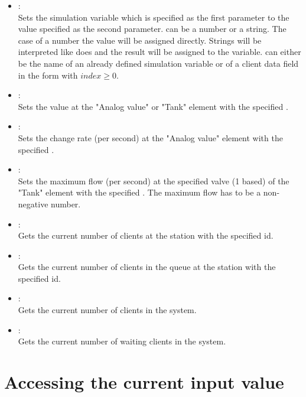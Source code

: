 \begin{itemize}

\item
{}:\\
Sets the simulation variable which is specified as the first parameter to the value specified as the second parameter.  
 can be a number or a string. The case of a number the value will be assigned directly.
Strings will be interpreted like  does and the result will be assigned to the variable. 
can either be the name of an already defined simulation variable or of a client data field in the form
 with $index\ge0$.

\item
{}:\\
Sets the value at the "Analog value" or "Tank" element with the specified .
  
\item
{}:\\
Sets the change rate (per second) at the "Analog value" element with the specified .
  
\item
{}:\\
Sets the maximum flow (per second) at the specified valve (1 based) of the "Tank" element
with the specified . The maximum flow has to be a non-negative number.  

\item
{}:\\
Gets the current number of clients at the station with the specified id.
  
\item
{}:\\
Gets the current number of clients in the queue at the station with the specified id.

\item
{}:\\
Gets the current number of clients in the system.
  
\item
{}:\\
Gets the current number of waiting clients in the system.

\end{itemize}

\section{Accessing the current input value}

